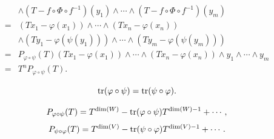 \begin{proofenv}
$$\begin{aligned}
        & \wedge (T - f \circ \Phi \circ f^{-1})(y_1) \wedge \cdots \wedge (T - f \circ \Phi \circ f^{-1})(y_m)\\
        = & (T x_1 - \varphi(x_1)) \wedge \cdots \wedge (T x_n - \varphi(x_n))\\
        & \wedge (T y_1 - \varphi(\psi(y_1))) \wedge \cdots \wedge (T y_m - \varphi(\psi(y_m)))\\
        = & P_{\varphi \circ \psi}(T) (T x_1 - \varphi(x_1)) \wedge \cdots \wedge (T x_n - \varphi(x_n)) \wedge y_1 \wedge \cdots \wedge y_m\\
        = & T^n P_{\varphi \circ \psi} (T).
    \end{aligned}$$
\end{proofenv}

\begin{corollaryenv}
    $$\operatorname{\mathrm{tr}}(\varphi \circ \psi) = \operatorname{\mathrm{tr}}(\psi \circ \varphi).$$
\end{corollaryenv}
\begin{proofenv}
    $$P_{\varphi \circ \psi}(T) = T^{\dim(W)} - \operatorname{\mathrm{tr}}(\varphi \circ \psi) T^{\dim(W) - 1} + \cdots,$$
    $$P_{\psi \circ \varphi}(T) = T^{\dim(V)} - \operatorname{\mathrm{tr}}(\psi \circ \varphi) T^{\dim(V) - 1} + \cdots.$$
\end{proofenv}
